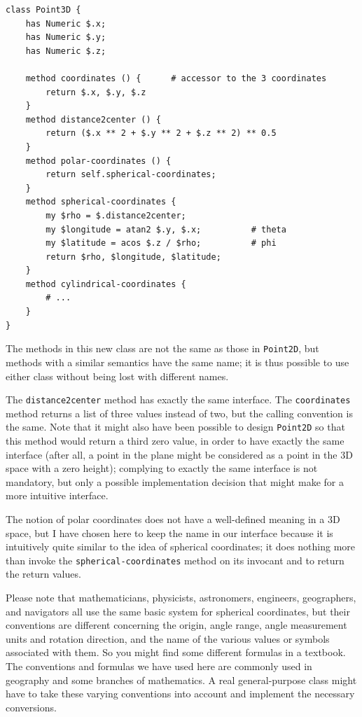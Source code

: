\begin{verbatim}
class Point3D {
    has Numeric $.x;
    has Numeric $.y;
    has Numeric $.z;
    
    method coordinates () {      # accessor to the 3 coordinates
        return $.x, $.y, $.z
    }
    method distance2center () {
        return ($.x ** 2 + $.y ** 2 + $.z ** 2) ** 0.5
    }
    method polar-coordinates () {
    	return self.spherical-coordinates;
    }
    method spherical-coordinates {
    	my $rho = $.distance2center;
    	my $longitude = atan2 $.y, $.x;          # theta
    	my $latitude = acos $.z / $rho;          # phi 
    	return $rho, $longitude, $latitude;
    }
    method cylindrical-coordinates {
    	# ...
    }
}
\end{verbatim}

The methods in this new class are not the same as those in 
{\tt Point2D}, but methods with a similar semantics have 
the same name; it is thus possible to use either class 
without being lost with different names. 

The {\tt distance2center} method has exactly the same interface. 
The {\tt coordinates} method returns a list of three values 
instead of two, but the calling convention is the same. Note 
that it might also have been possible to design {\tt Point2D} 
so that this method would return a third zero value, in order 
to have exactly the same interface (after all, a point in 
the plane might be considered as a point in the 3D space 
with a zero height); complying to exactly the same 
interface is not mandatory, but only a possible implementation 
decision that might make for a more intuitive interface. 

The notion of polar coordinates does not have a well-defined 
meaning in a 3D space, but I have chosen here to keep the name 
in our interface because it is intuitively quite similar to 
the idea of spherical coordinates; it does nothing more 
than invoke the \verb'spherical-coordinates' method on 
its invocant and to return the return values.

Please note that mathematicians, physicists, astronomers, 
engineers, geographers, and navigators all use the same basic system 
for spherical coordinates, but their conventions are different 
concerning the origin, angle range, angle measurement 
units and rotation direction, and the name of the various 
values or symbols associated with them. So you might find 
some different formulas in a textbook. The conventions and 
formulas we have used here are commonly used in geography and 
some branches of mathematics. A real general-purpose class 
might have to take these varying conventions into account and 
implement the necessary conversions.

